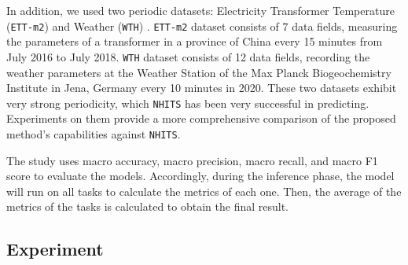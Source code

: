 \documentclass[aps,prb,groupedaddress,twocolumn,showpacs,dvipdfmx,superscriptaddress,pdftex]{revtex4-2}
\begin{document}
\vspace{2mm}


In addition, we used two periodic datasets: Electricity Transformer Temperature (\verb|ETT-m2|) \cite{zhou2021informer} and Weather (\verb|WTH|) \cite{Kolle}. \verb|ETT-m2| dataset consists of 7 data fields, measuring the parameters of a transformer in a province of China every 15 minutes from July 2016 to July 2018. \verb|WTH| dataset consists of 12 data fields, recording the weather parameters at the Weather Station of the Max Planck Biogeochemistry Institute in Jena, Germany every 10 minutes in 2020. These two datasets exhibit very strong periodicity, which \verb|NHITS| has been very successful in predicting. Experiments on them provide a more comprehensive comparison of the proposed method's capabilities against \verb|NHITS|.

\vspace{2mm}


The study uses macro accuracy, macro precision, macro recall, and macro F1 score to evaluate the models. Accordingly, during the inference phase, the model will run on all tasks to calculate the metrics of each one. Then, the average of the metrics of the tasks is calculated to obtain the final result.

\vspace{2mm}
\subsection{Experiment}
\end{document}
